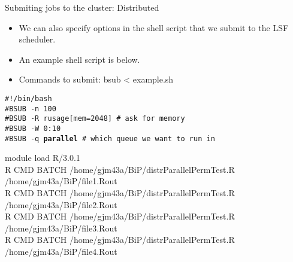 \begin{frame}{Submiting jobs to the cluster: Distributed}
\begin{itemize}
\item We can also specify options in the shell script that we submit to the LSF scheduler.  
\item An example shell script is below. 
\item Commands to submit: bsub < example.sh
\end{itemize}
{\tt \#!/bin/bash\\
\#BSUB -n 100\\
\#BSUB -R rusage[mem=2048] \# ask for memory\\
\#BSUB -W 0:10\\
\#BSUB -q {\bf parallel}  \# which queue we want to run in

module load R/3.0.1\\
R CMD BATCH /home/gjm43a/BiP/distrParallelPermTest.R /home/gjm43a/BiP/file1.Rout\\
R CMD BATCH /home/gjm43a/BiP/distrParallelPermTest.R /home/gjm43a/BiP/file2.Rout\\
R CMD BATCH /home/gjm43a/BiP/distrParallelPermTest.R /home/gjm43a/BiP/file3.Rout\\
R CMD BATCH /home/gjm43a/BiP/distrParallelPermTest.R /home/gjm43a/BiP/file4.Rout}
\end{frame}






